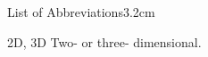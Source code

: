 \begin{mclistof}{List of Abbreviations}{3.2cm}

\item[2D, 3D] Two- or three- dimensional.

\end{mclistof} 
